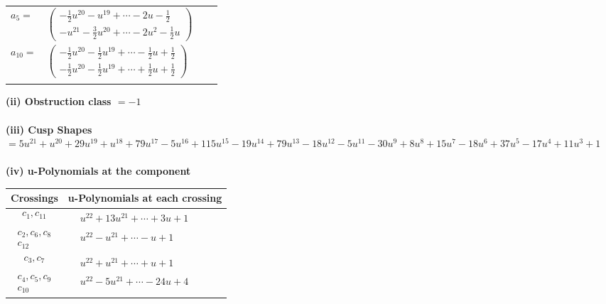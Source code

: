 \documentclass[1p]{elsarticle_modified}
\theoremstyle{definition}
\begin{document}
\begin{tabular}{m{7pt} m{180pt} m{7pt} m{180pt} }
\flushright $a_{5}=$&$\begin{pmatrix}-\frac{1}{2} u^{20}- u^{19}+\cdots-2 u-\frac{1}{2}\\- u^{21}-\frac{3}{2} u^{20}+\cdots-2 u^2-\frac{1}{2} u\end{pmatrix}$ \\
\flushright $a_{10}=$&$\begin{pmatrix}-\frac{1}{2} u^{20}-\frac{1}{2} u^{19}+\cdots-\frac{1}{2} u+\frac{1}{2}\\-\frac{1}{2} u^{20}-\frac{1}{2} u^{19}+\cdots+\frac{1}{2} u+\frac{1}{2}\end{pmatrix}$\\&\end{tabular}
\flushleft \textbf{(ii) Obstruction class $= -1$}\\~\\
\flushleft \textbf{(iii) Cusp Shapes $= 5 u^{21}+u^{20}+29 u^{19}+u^{18}+79 u^{17}-5 u^{16}+115 u^{15}-19 u^{14}+79 u^{13}-18 u^{12}-5 u^{11}-30 u^9+8 u^8+15 u^7-18 u^6+37 u^5-17 u^4+11 u^3+1$}\\~\\
\newpage\renewcommand{\arraystretch}{1}
\flushleft \textbf{(iv) u-Polynomials at the component}\newline \\
\begin{tabular}{m{50pt}|m{274pt}}
Crossings & \hspace{64pt}u-Polynomials at each crossing \\
\hline $$\begin{aligned}c_{1},c_{11}\end{aligned}$$&$\begin{aligned}
&u^{22}+13 u^{21}+\cdots+3 u+1
\end{aligned}$\\
\hline $$\begin{aligned}c_{2},c_{6},c_{8}\\c_{12}\end{aligned}$$&$\begin{aligned}
&u^{22}- u^{21}+\cdots- u+1
\end{aligned}$\\
\hline $$\begin{aligned}c_{3},c_{7}\end{aligned}$$&$\begin{aligned}
&u^{22}+u^{21}+\cdots+u+1
\end{aligned}$\\
\hline $$\begin{aligned}c_{4},c_{5},c_{9}\\c_{10}\end{aligned}$$&$\begin{aligned}
&u^{22}-5 u^{21}+\cdots-24 u+4
\end{aligned}$\\
\hline
\end{tabular}\\~\\
\end{document}
